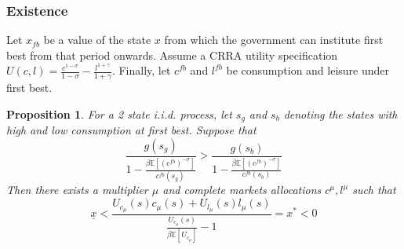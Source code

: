\documentclass{beamer}
\newcommand{\EE}{\mathbb E}
\newtheorem{proposition}{Proposition}
\begin{document}
 \begin{frame}
	\frametitle{Existence}
	Let $x_{fb}$ be a value of the state $x$ from which the government can institute first best from that period onwards.  Assume a CRRA utility specification $U(c,l) = \frac{c^{1-\sigma}}{1-\sigma} -\frac{ l^{1+\gamma}}{1+\gamma}$.  Finally, let  $c^{fb}$ and $l^{fb}$ be consumption and leisure under first best. 
	\begin{proposition}  For a 2 state i.i.d. process, let  $s_g$ and $s_b$ denoting the states with high and low consumption at first best.  Suppose that
	\[
		\frac{g(s_g)}{1-\frac{\beta\EE[(c^{fb})^{-\sigma}]}{c^{fb}(s_g)}} > \frac{g(s_b)}{1-\frac{\beta\EE[(c^{fb})^{-\sigma}]}{c^{fb}(s_b)}}
	\]  Then there exists a multiplier $\mu$ and complete markets allocations $c^\mu,l^\mu$ such that
	\[
	\underline x<\frac{U_{c_\mu}(s)c_\mu(s) + U_{l_\mu}(s) l_\mu(s)}{\frac{U_{c_\mu}(s)}{\beta\EE[U_{c_\mu}]}-1} = x^* <0
	\]
	\end{proposition}
\end{frame}


%
\end{document}
